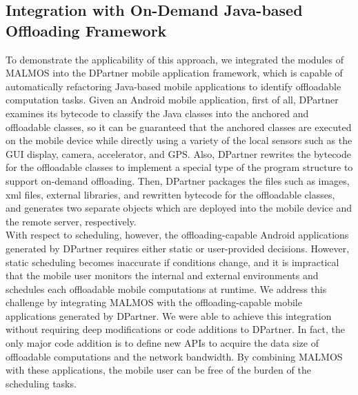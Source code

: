 \documentclass[10pt, conference, compsocconf]{IEEEtran}
\begin{document}
{\subsection{Integration with On-Demand Java-based Offloading Framework}
%
To demonstrate the applicability of this approach, we integrated the
modules of MALMOS into the DPartner mobile application framework, which
is capable of automatically refactoring Java-based mobile applications
to identify offloadable computation tasks.
%
Given an Android mobile application, first of all, DPartner examines its
bytecode to classify the Java classes into the anchored and offloadable
classes, so it can be guaranteed that the anchored classes are executed
on the mobile device while directly using a variety of the local sensors
such as the GUI display, camera, accelerator, and GPS.
%
Also, DPartner rewrites the bytecode for the offloadable classes to
implement a special type of the program structure to support on-demand
offloading.
%
Then, DPartner packages the files such as images, xml files, external
libraries, and rewritten bytecode for the offloadable classes, and
generates two separate objects which are deployed into the mobile device
and the remote server, respectively.\\
%
\indent With respect to scheduling, however, the offloading-capable
Android applications generated by DPartner requires either static or
user-provided decisions. 
%
However, static scheduling becomes inaccurate if conditions change, and
it is impractical that the mobile user monitors the internal and
external environments and schedules each offloadable mobile computations
at runtime.
%
We address this challenge by integrating MALMOS with the
offloading-capable mobile applications generated by DPartner. 
%
We were able to achieve this integration without requiring deep
modifications or code additions to DPartner.
%
In fact, the only major code addition is to define new APIs to acquire
the data size of offloadable computations and the network bandwidth. 
%
By combining MALMOS with these applications, the mobile user can be free
of the burden of the scheduling tasks.
%
}
\end{document}
